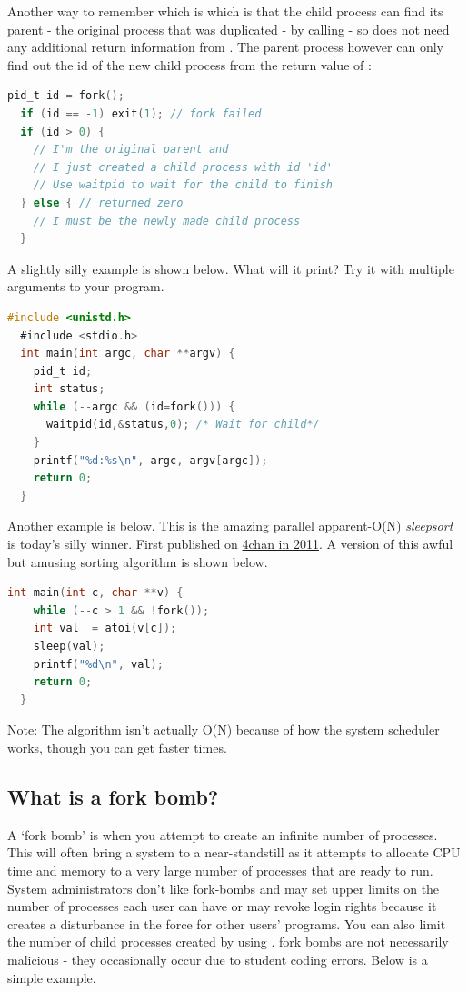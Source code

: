 Another way to remember which is which is that the child process can find its parent - the original process that was duplicated - by calling  - so does not need any additional return information from .
The parent process however can only find out the id of the new child process from the return value of :

\begin{lstlisting}[language=C]
  pid_t id = fork();
  if (id == -1) exit(1); // fork failed 
  if (id > 0) { 
    // I'm the original parent and 
    // I just created a child process with id 'id'
    // Use waitpid to wait for the child to finish
  } else { // returned zero
    // I must be the newly made child process
  }
\end{lstlisting}

A slightly silly example is shown below. What will it print? Try it with multiple arguments to your program.

\begin{lstlisting}[language=C]
  #include <unistd.h>
  #include <stdio.h>
  int main(int argc, char **argv) {
    pid_t id;
    int status; 
    while (--argc && (id=fork())) {
      waitpid(id,&status,0); /* Wait for child*/
    }
    printf("%d:%s\n", argc, argv[argc]);
    return 0;
  }
\end{lstlisting}

Another example is below. This is the amazing parallel apparent-O(N) \emph{sleepsort} is today's silly winner. First published on \href{https://dis.4chan.org/read/prog/1295544154}{4chan in 2011}. A version of this awful but amusing sorting algorithm is shown below.

\begin{lstlisting}[language=C]
  int main(int c, char **v) {
    while (--c > 1 && !fork());
    int val  = atoi(v[c]);
    sleep(val);
    printf("%d\n", val);
    return 0;
  }
\end{lstlisting}

Note: The algorithm isn't actually O(N) because of how the system scheduler works, though you can get faster times.

\subsection{What is a fork bomb?}

A `fork bomb' is when you attempt to create an infinite number of processes.
This will often bring a system to a near-standstill as it attempts to allocate CPU time and memory to a very large number of processes that are ready to run.
System administrators don't like fork-bombs and may set upper limits on the number of processes each user can have or may revoke login rights because it creates a disturbance in the force for other users' programs.
You can also limit the number of child processes created by using .
fork bombs are not necessarily malicious - they occasionally occur due to student coding errors.
Below is a simple example.

